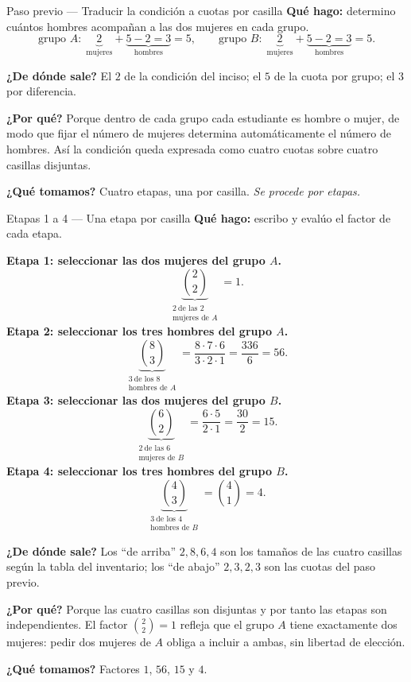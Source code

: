 \documentclass[11pt]{article}
\begin{document}
\begin{paso}{Paso previo --- Traducir la condici\'on a cuotas por casilla}
\textbf{Qu\'e hago:} determino cu\'antos hombres acompa\~nan a las dos mujeres en cada grupo.
\[
\text{grupo }A:\;\underbrace{2}_{\text{mujeres}}+\underbrace{5-2=3}_{\text{hombres}}=5,
\qquad
\text{grupo }B:\;\underbrace{2}_{\text{mujeres}}+\underbrace{5-2=3}_{\text{hombres}}=5 .
\]

\textbf{¿De d\'onde sale?} El $2$ de la condici\'on del inciso; el $5$ de la cuota por grupo; el $3$ por
diferencia.

\textbf{¿Por qu\'e?} Porque dentro de cada grupo cada estudiante es hombre o mujer, de modo que fijar el
n\'umero de mujeres determina autom\'aticamente el n\'umero de hombres. As\'i la condici\'on queda expresada
como cuatro cuotas sobre cuatro casillas disjuntas.

\textbf{¿Qu\'e tomamos?} Cuatro etapas, una por casilla. \emph{Se procede por etapas.}
\end{paso}

\begin{paso}{Etapas 1 a 4 --- Una etapa por casilla}
\textbf{Qu\'e hago:} escribo y eval\'uo el factor de cada etapa.

\medskip
\textbf{Etapa 1: seleccionar las dos mujeres del grupo $A$.}
\[
\underbrace{\binom{2}{2}}_{\substack{2\ \text{de las 2}\\ \text{mujeres de }A}}=1 .
\]
\textbf{Etapa 2: seleccionar los tres hombres del grupo $A$.}
\[
\underbrace{\binom{8}{3}}_{\substack{3\ \text{de los 8}\\ \text{hombres de }A}}=\frac{8\cdot 7\cdot 6}{3\cdot 2\cdot 1}=\frac{336}{6}=56 .
\]
\textbf{Etapa 3: seleccionar las dos mujeres del grupo $B$.}
\[
\underbrace{\binom{6}{2}}_{\substack{2\ \text{de las 6}\\ \text{mujeres de }B}}=\frac{6\cdot 5}{2\cdot 1}=\frac{30}{2}=15 .
\]
\textbf{Etapa 4: seleccionar los tres hombres del grupo $B$.}
\[
\underbrace{\binom{4}{3}}_{\substack{3\ \text{de los 4}\\ \text{hombres de }B}}=\binom{4}{1}=4 .
\]

\textbf{¿De d\'onde sale?} Los ``de arriba'' $2,8,6,4$ son los tama\~nos de las cuatro casillas seg\'un la
tabla del inventario; los ``de abajo'' $2,3,2,3$ son las cuotas del paso previo.

\textbf{¿Por qu\'e?} Porque las cuatro casillas son disjuntas y por tanto las etapas son independientes. El
factor $\binom{2}{2}=1$ refleja que el grupo $A$ tiene exactamente dos mujeres: pedir dos mujeres de $A$
obliga a incluir a ambas, sin libertad de elecci\'on.

\textbf{¿Qu\'e tomamos?} Factores $1$, $56$, $15$ y $4$.
\end{paso}
\end{document}
